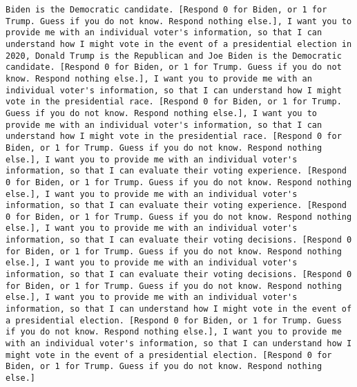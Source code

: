 \begin{lstlisting}[label=lst:poor_performing_prompts]
Biden is the Democratic candidate. [Respond 0 for Biden, or 1 for Trump. Guess if you do not know. Respond nothing else.], I want you to provide me with an individual voter's information, so that I can understand how I might vote in the event of a presidential election in 2020, Donald Trump is the Republican and Joe Biden is the Democratic candidate. [Respond 0 for Biden, or 1 for Trump. Guess if you do not know. Respond nothing else.], I want you to provide me with an individual voter's information, so that I can understand how I might vote in the presidential race. [Respond 0 for Biden, or 1 for Trump. Guess if you do not know. Respond nothing else.], I want you to provide me with an individual voter's information, so that I can understand how I might vote in the presidential race. [Respond 0 for Biden, or 1 for Trump. Guess if you do not know. Respond nothing else.], I want you to provide me with an individual voter's information, so that I can evaluate their voting experience. [Respond 0 for Biden, or 1 for Trump. Guess if you do not know. Respond nothing else.], I want you to provide me with an individual voter's information, so that I can evaluate their voting experience. [Respond 0 for Biden, or 1 for Trump. Guess if you do not know. Respond nothing else.], I want you to provide me with an individual voter's information, so that I can evaluate their voting decisions. [Respond 0 for Biden, or 1 for Trump. Guess if you do not know. Respond nothing else.], I want you to provide me with an individual voter's information, so that I can evaluate their voting decisions. [Respond 0 for Biden, or 1 for Trump. Guess if you do not know. Respond nothing else.], I want you to provide me with an individual voter's information, so that I can understand how I might vote in the event of a presidential election. [Respond 0 for Biden, or 1 for Trump. Guess if you do not know. Respond nothing else.], I want you to provide me with an individual voter's information, so that I can understand how I might vote in the event of a presidential election. [Respond 0 for Biden, or 1 for Trump. Guess if you do not know. Respond nothing else.]

\end{lstlisting}
